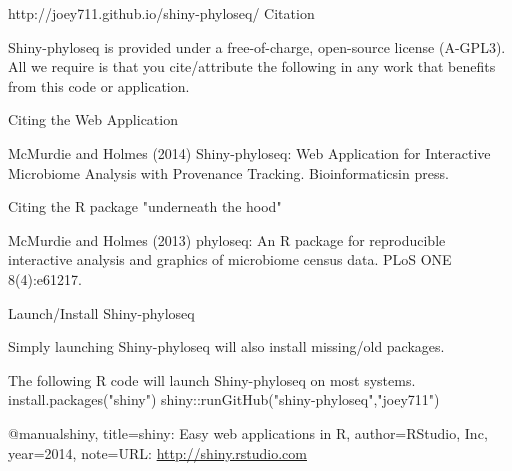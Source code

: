http://joey711.github.io/shiny-phyloseq/
Citation

Shiny-phyloseq is provided under a free-of-charge, open-source license (A-GPL3). All we require is that you cite/attribute the following in any work that benefits from this code or application.

 Citing the Web Application

McMurdie and Holmes (2014) Shiny-phyloseq: Web Application for Interactive Microbiome Analysis with Provenance Tracking. Bioinformaticsin press.

 Citing the R package "underneath the hood"

McMurdie and Holmes (2013) phyloseq: An R package for reproducible interactive analysis and graphics of microbiome census data. PLoS ONE 8(4):e61217.

 
Launch/Install Shiny-phyloseq
 
Simply launching Shiny-phyloseq will also install missing/old packages.
 
The following R code will launch Shiny-phyloseq on most systems.
 install.packages("shiny")
shiny::runGitHub("shiny-phyloseq","joey711")



@manual{shiny, 
  title={shiny: Easy web applications in R}, 
  author={{RStudio, Inc}}, 
  year={2014}, 
  note={URL: \url{http://shiny.rstudio.com}} 
} 
